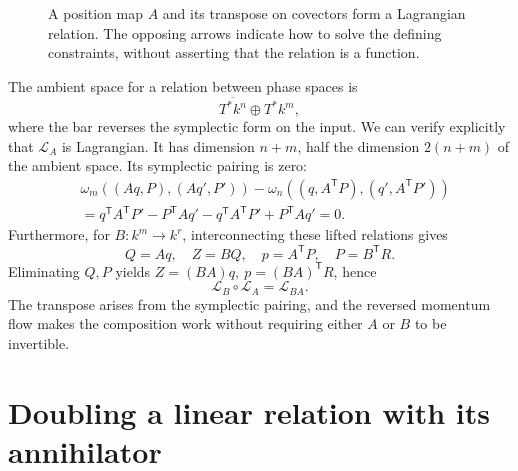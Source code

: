 \begin{figure}[H]
\centering
{}
\caption{A position map \(A\) and its transpose on covectors form a Lagrangian relation. The opposing arrows indicate how to solve the defining constraints, without asserting that the relation is a function.}
\end{figure}

The ambient space for a relation between phase spaces is
\[
 \overline{T^*k^n}\oplus T^*k^m,
\]
where the bar reverses the symplectic form on the input. We can verify explicitly that \(\mathcal L_A\) is Lagrangian. It has dimension \(n+m\), half the dimension \(2(n+m)\) of the ambient space. Its symplectic pairing is zero:
\[
 \begin{aligned}
 &\omega_m((Aq,P),(Aq',P'))-
     \omega_n((q,A^{\mathsf T}P),(q',A^{\mathsf T}P'))\\
 &=q^{\mathsf T}A^{\mathsf T}P'-P^{\mathsf T}Aq'
   -q^{\mathsf T}A^{\mathsf T}P'
   +P^{\mathsf T}Aq'=0.
 \end{aligned}
\]
Furthermore, for \(B:k^m\to k^r\), interconnecting these lifted relations gives
\[
 Q=Aq,\quad Z=BQ,\quad
 p=A^{\mathsf T}P,\quad P=B^{\mathsf T}R.
\]
Eliminating \(Q,P\) yields \(Z=(BA)q,\ p=(BA)^{\mathsf T}R\), hence
\[
 \boxed{\mathcal L_B\circ\mathcal L_A=\mathcal L_{BA}.}
\]
The transpose arises from the symplectic pairing, and the reversed momentum flow makes the composition work without requiring either \(A\) or \(B\) to be invertible.

\section{Doubling a linear relation with its annihilator}

